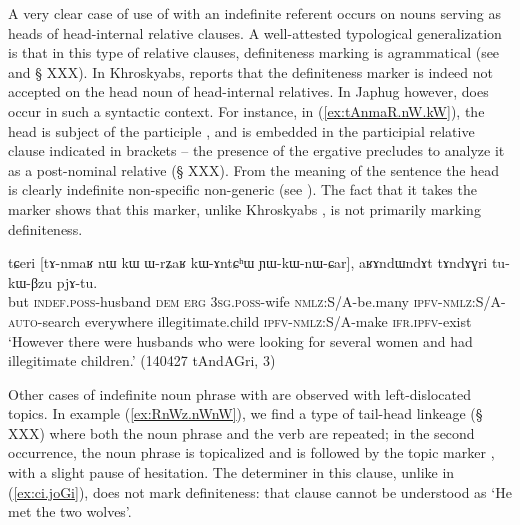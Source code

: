 A very clear case of use of  with an indefinite referent occurs on nouns serving as heads of head-internal relative clauses. A well-attested typological generalization is that in this type of relative clauses, definiteness marking is agrammatical (see \citealt{basilico96internally} and § XXX). In Khroskyabs, \citet[636]{lai17khroskyabs} reports that the definiteness marker  is indeed not accepted on the head noun of head-internal relatives. In Japhug however,  does occur in such a syntactic context. For instance, in (\ref{ex:tAnmaR.nW.kW}), the head  is subject of the participle , and is embedded in the participial relative clause indicated in brackets -- the presence of the ergative  precludes to analyze it as a post-nominal relative (§ XXX). From the meaning of the sentence the head  is clearly indefinite non-specific non-generic  (see \citealt[286-291]{lehmann84relativsatz}). The fact that it takes the marker  shows that this marker, unlike Khroskyabs , is not primarily marking definiteness.

\begin{exe}
\ex \label{ex:tAnmaR.nW.kW}
 \gll tɕeri [tɤ-nmaʁ nɯ kɯ ɯ-rʑaʁ kɯ-ɤntɕʰɯ ɲɯ-kɯ-nɯ-ɕar], aʁɤndɯndɤt tɤndɤɣri tu-kɯ-βzu pjɤ-tu.  \\
but  \textsc{indef}.\textsc{poss}-husband \textsc{dem} \textsc{erg} \textsc{3sg}.\textsc{poss}-wife  \textsc{nmlz}:S/A-be.many \textsc{ipfv}-\textsc{nmlz}:S/A-\textsc{auto}-search everywhere  illegitimate.child  \textsc{ipfv}-\textsc{nmlz}:S/A-make \textsc{ifr}.\textsc{ipfv}-exist \\
\glt `However there were husbands who were looking for several women and had illegitimate children.' (140427 tAndAGri, 3)
\end{exe}

Other cases of indefinite noun phrase with  are observed with left-dislocated topics. In example (\ref{ex:RnWz.nWnW}), we find a type of tail-head linkeage  (§ XXX) where both the noun phrase  and the verb  are repeated; in the second occurrence, the noun phrase is topicalized and is followed by the topic marker , with a slight pause of hesitation. The determiner  in this clause, unlike  in (\ref{ex:ci.joGi}), does not mark definiteness: that clause cannot be understood as `He met the two wolves'.


